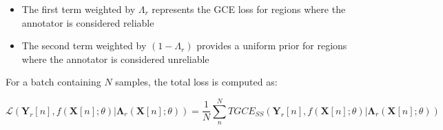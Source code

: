 \begin{itemize}
  \item The first term weighted by $\Lambda_r$ represents the GCE
    loss for regions where the annotator is considered reliable
  \item The second term weighted by $(1-\Lambda_r)$ provides a
    uniform prior for regions where the annotator is considered unreliable
\end{itemize}

For a batch containing $N$ samples, the total loss is computed as:

\begin{equation}
  \mathscr{L}\left(\mathbf{Y}_r[n],f(\mathbf X[n];\theta) |
  \mathbf{\Lambda}_r (\mathbf X[n];\theta)\right)  = \frac{1}{N}
  \sum_{n}^N TGCE_{SS}(\mathbf{Y}_r[n],f(\mathbf X[n];\theta) |
  \mathbf{\Lambda}_r (\mathbf X[n];\theta))
\end{equation}

